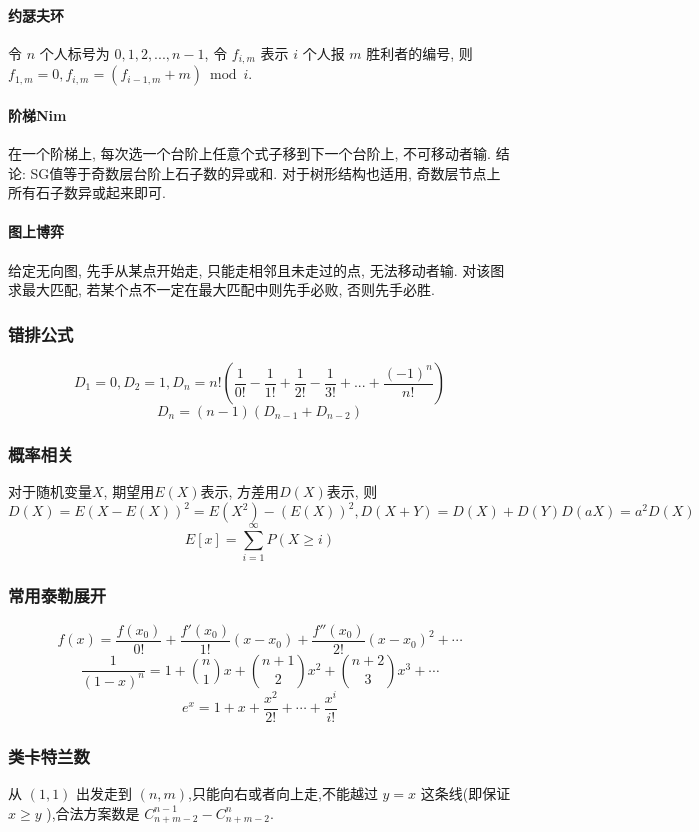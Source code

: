 \begin{small}
\begin{multicols}{2}
\paragraph{约瑟夫环}令 $n$ 个人标号为 $0,1,2,...,n-1$, 令 $f_{i,m}$ 表示 $i$ 个人报 $m$ 胜利者的编号, 则 $f_{1,m}=0,f_{i,m}=(f_{i-1,m}+m)\bmod i$. 
\paragraph{阶梯Nim} 在一个阶梯上, 每次选一个台阶上任意个式子移到下一个台阶上, 不可移动者输. 结论: SG值等于奇数层台阶上石子数的异或和. 对于树形结构也适用, 奇数层节点上所有石子数异或起来即可.
\paragraph{图上博弈} 给定无向图, 先手从某点开始走, 只能走相邻且未走过的点, 无法移动者输. 对该图求最大匹配, 若某个点不一定在最大匹配中则先手必败, 否则先手必胜.
\end{multicols}



\subsubsection{错排公式}
\[D_1=0,D_2=1,D_n=n!(\frac{1}{0!}-\frac{1}{1!}+\frac{1}{2!}-\frac{1}{3!}+...+\frac{(-1)^n}{n!})\]
\[D_n=(n-1)(D_{n-1}+D_{n-2})\]
\subsubsection{概率相关}
对于随机变量$X$, 期望用$E(X)$表示, 方差用$D(X)$表示, 则$D(X)=E(X-E(X))^2=E(X^2)-(E(X))^2,D(X+Y)=D(X)+D(Y)D(aX)=a^2D(X)$
\[E[x]=\sum_{i=1}^{\infty}P(X\geq i)\]
\subsubsection{常用泰勒展开}
\[f(x)=\frac{f(x_0)}{0!}+\frac{f'(x_0)}{1!}(x-x_0)+\frac{f''(x_0)}{2!}(x-x_0)^2+\cdots\]
\[\frac{1}{(1-x)^n}=1+\binom{n}{1}x+\binom{n+1}{2}x^2+\binom{n+2}{3}x^3+\cdots \]
\[e^x=1+x+\frac{x^2}{2!}+\cdots+\frac{x^i}{i!}\]

\subsubsection{类卡特兰数}
从 $(1,1)$ 出发走到 $(n,m)$,只能向右或者向上走,不能越过 $y=x$ 这条线(即保证 $x\geq y$ ),合法方案数是 $C_{n+m-2}^{n-1} - C_{n+m-2}^n$.


\end{small}
